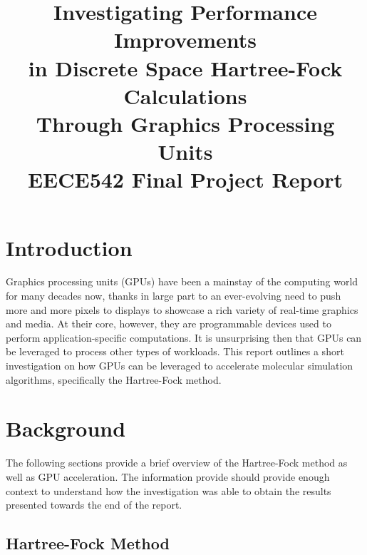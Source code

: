 \documentclass[conference, twoside]{IEEEtran}
\begin{document}

\title{Investigating Performance Improvements\\in Discrete Space Hartree-Fock Calculations\\Through Graphics Processing Units\\{\large EECE542 Final Project Report}}
\author{
}

%
{}
\maketitle

\section{Introduction} %

Graphics processing units (GPUs) have been a mainstay of the computing world for many decades now, thanks in large part to an ever-evolving need to push more and more pixels to displays to showcase a rich variety of real-time graphics and media. At their core, however, they are programmable devices used to perform application-specific computations. It is unsurprising then that GPUs can be leveraged to process other types of workloads. This report outlines a short investigation on how GPUs can be leveraged to accelerate molecular simulation algorithms, specifically the Hartree-Fock method.

\section{Background} %

The following sections provide a brief overview of the Hartree-Fock method as well as GPU acceleration. The information provide should provide enough context to understand how the investigation was able to obtain the results presented towards the end of the report.

\subsection{Hartree-Fock Method} %
\end{document}
